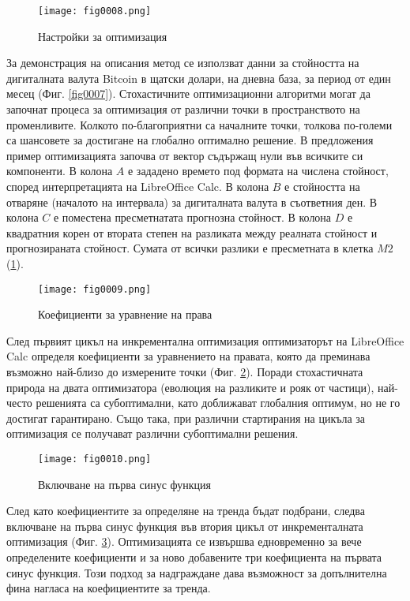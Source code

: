\begin{figure}[H]
  \centering
  \texttt{[image: fig0008.png]}
  \caption{Настройки за оптимизация}
\label{fig0008}
\end{figure}

За демонстрация на описания метод се използват данни за стойността на дигиталната валута Bitcoin в щатски долари, на дневна база, за период от един месец (Фиг. \ref{fig0007}). Стохастичните оптимизационни алгоритми могат да започнат процеса за оптимизация от различни точки в пространството на променливите. Колкото по-благоприятни са началните точки, толкова по-големи са шансовете за достигане на глобално оптимално решение. В предложения пример оптимизацията започва от вектор съдържащ нули във всичките си компоненти. В колона $A$ е зададено времето под формата на числена стойност, според интерпретацията на LibreOffice Calc. В колона $B$ е стойността на отваряне (началото на интервала) за дигиталната валута в съответния ден. В колона $C$ е поместена пресметнатата прогнозна стойност. В колона $D$ е квадратния корен от втората степен на разликата между реалната стойност и прогнозираната стойност. Сумата от всички разлики е пресметната в клетка $M2$ (\ref{fig0008}).

\begin{figure}[H]
  \centering
  \texttt{[image: fig0009.png]}
  \caption{Коефициенти за уравнение на права}
\label{fig0009}
\end{figure}

След първият цикъл на инкрементална оптимизация оптимизаторът на LibreOffice Calc определя коефициенти за уравнението на правата, която да преминава възможно най-близо до измерените точки (Фиг. \ref{fig0009}). Поради стохастичната природа на двата оптимизатора (еволюция на разликите и рояк от частици), най-често решенията са субоптимални, като доближават глобалния оптимум, но не го достигат гарантирано. Също така, при различни стартирания на цикъла за оптимизация се получават различни субоптимални решения. 

\begin{figure}[H]
  \centering
  \texttt{[image: fig0010.png]}
  \caption{Включване на първа синус функция}
\label{fig0010}
\end{figure}

След като коефициентите за определяне на тренда бъдат подбрани, следва включване на първа синус функция във втория цикъл от инкременталната оптимизация (Фиг. \ref{fig0010}). Оптимизацията се извършва едновременно за вече определените коефициенти и за ново добавените три коефициента на първата синус функция. Този подход за надграждане дава възможност за допълнителна фина нагласа на коефициентите за тренда. 

